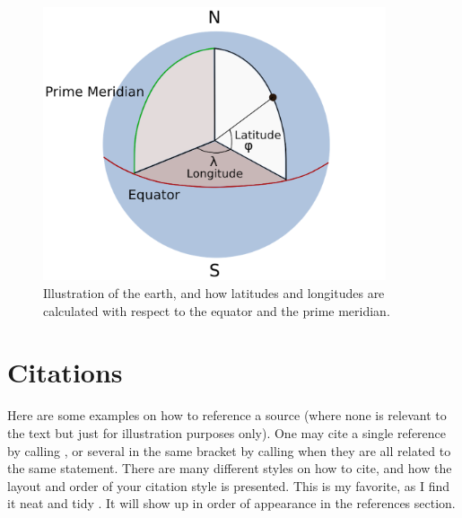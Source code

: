 \begin{figure}[H]
  \centering
  \includegraphics[width=0.9\textwidth]{Figures/latlong.png}
  \caption[Illustration of latitude and longitude]{Illustration of the earth, and how latitudes and longitudes are calculated with respect to the equator and the prime meridian.}
  \label{fig:latlong}
\end{figure}


\section{Citations}

Here are some examples on how to reference a source (where none is relevant to the text but just for illustration purposes only). One may cite a single reference by calling \cite{wolves_of_mount_mckinley}, or several in the same bracket by calling \cite{machine_learning, clustering_impossibility} when they are all related to the same statement. There are many different styles on how to cite, and how the layout and order of your citation style is presented. This is my favorite, as I find it neat and tidy \cite{sheep}. It will show up in order of appearance in the references section.
